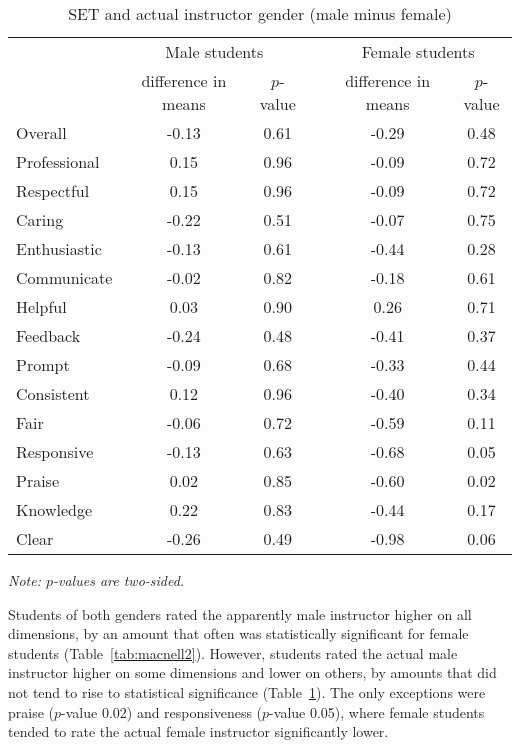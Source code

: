 \documentclass[12pt]{article}
\begin{document}
\begin{table}[htbp]
  \centering
  \footnotesize 
  \caption{SET and actual instructor gender (male minus female)}
    \begin{tabular}{lccccc}
    \toprule 
          & \multicolumn{2}{c}{Male students}  &  & \multicolumn{2}{c}{Female students} \\
                          & difference in means  &  $p$-value &  & difference in means & $p$-value    \\
                          
   \midrule
    Overall &		-0.13	& 0.61 & & -0.29   & 0.48   \\
    Professional &	0.15	& 0.96 & & -0.09   & 0.72   \\
    Respectful  & 	0.15	& 0.96 & & -0.09   & 0.72   \\
    Caring & 		-0.22	& 0.51 & & -0.07   & 0.75  \\
    Enthusiastic &	-0.13	& 0.61 & & -0.44   & 0.28   \\
    Communicate &	-0.02	& 0.82 & & -0.18   & 0.61  \\
    Helpful &		0.03	& 0.90 & &  0.26   & 0.71   \\
    Feedback &		-0.24	& 0.48 & & -0.41   & 0.37   \\
    Prompt &		-0.09	& 0.68 & & -0.33   & 0.44   \\
    Consistent &		0.12	& 0.96 & & -0.40   & 0.34   \\
    Fair &			-0.06	& 0.72 & & -0.59   & 0.11  \\
    Responsive & 	-0.13	& 0.63 & & -0.68   & 0.05  \\
    Praise & 		0.02	& 0.85 & & -0.60   & 0.02  \\
    Knowledge &		0.22	& 0.83 & & -0.44   & 0.17  \\
    Clear &			-0.26	& 0.49 & & -0.98   & 0.06  \\
    \bottomrule
    \end{tabular}%
 \label{tab:macnell3}%

  \textit{Note: $p$-values are two-sided.}  
\end{table}%
\normalsize

Students of both genders rated the apparently male instructor higher on all
dimensions, by an amount that often was statistically significant for female students 
(Table~\ref{tab:macnell2}).
However, students rated the actual male instructor higher on some dimensions
and lower on others, by amounts that did not tend to rise to statistical significance
(Table~\ref{tab:macnell3}). 
The only exceptions were praise ($p$-value 0.02) and responsiveness ($p$-value 0.05), where female students tended to rate the actual female instructor significantly lower.
\end{document}
